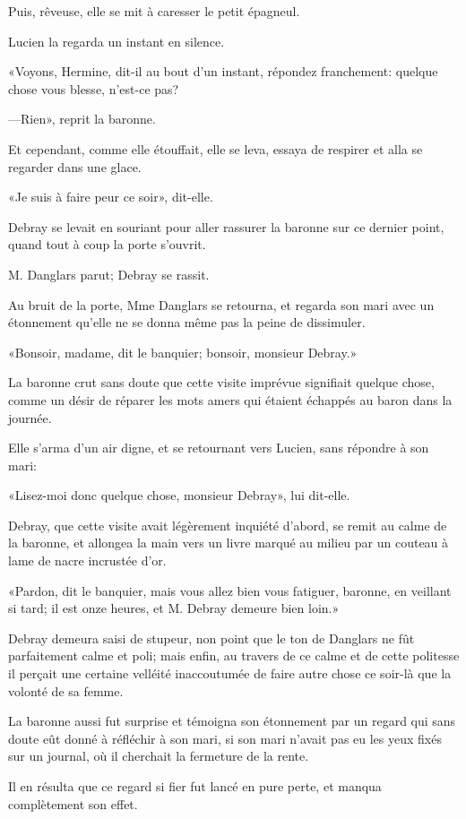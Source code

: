 Puis, rêveuse, elle se mit à caresser le petit épagneul. 

Lucien la regarda un instant en silence. 

«Voyons, Hermine, dit-il au bout d'un instant, répondez franchement: quelque chose vous blesse, n'est-ce pas? 

—Rien», reprit la baronne. 

Et cependant, comme elle étouffait, elle se leva, essaya de respirer et alla se regarder dans une glace. 

«Je suis à faire peur ce soir», dit-elle.  

Debray se levait en souriant pour aller rassurer la baronne sur ce dernier point, quand tout à coup la porte s'ouvrit. 

M. Danglars parut; Debray se rassit. 

Au bruit de la porte, Mme Danglars se retourna, et regarda son mari avec un étonnement qu'elle ne se donna même pas la peine de dissimuler. 

«Bonsoir, madame, dit le banquier; bonsoir, monsieur Debray.» 

La baronne crut sans doute que cette visite imprévue signifiait quelque chose, comme un désir de réparer les mots amers qui étaient échappés au baron dans la journée. 

Elle s'arma d'un air digne, et se retournant vers Lucien, sans répondre à son mari: 

«Lisez-moi donc quelque chose, monsieur Debray», lui dit-elle. 

Debray, que cette visite avait légèrement inquiété d'abord, se remit au calme de la baronne, et allongea la main vers un livre marqué au milieu par un couteau à lame de nacre incrustée d'or. 

«Pardon, dit le banquier, mais vous allez bien vous fatiguer, baronne, en veillant si tard; il est onze heures, et M. Debray demeure bien loin.» 

Debray demeura saisi de stupeur, non point que le ton de Danglars ne fût parfaitement calme et poli; mais enfin, au travers de ce calme et de cette politesse il perçait une certaine velléité inaccoutumée de faire autre chose ce soir-là que la volonté de sa femme. 

La baronne aussi fut surprise et témoigna son étonnement par un regard qui sans doute eût donné à réfléchir à son mari, si son mari n'avait pas eu les yeux fixés sur un journal, où il cherchait la fermeture de la rente. 

Il en résulta que ce regard si fier fut lancé en pure perte, et manqua complètement son effet. 

